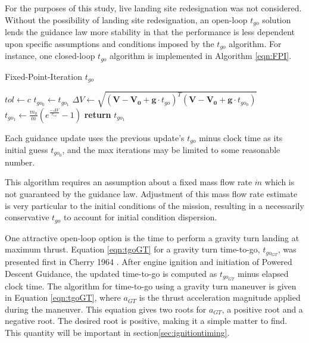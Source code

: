 For the purposes of this study, live landing site redesignation was not considered. Without the possibility of landing site redesignation, an open-loop $t_{go}$ solution lends the guidance law more stability in that the performance is less dependent upon specific assumptions and conditions imposed by the $t_{go}$ algorithm. For instance, one closed-loop $t_{go}$ algorithm is implemented in Algorithm \ref{eqn:FPI}.

\begin{algorithm}
	\caption{Fixed-Point-Iteration $t_{go}$}\label{eqn:FPI}
	\begin{algorithmic}[1]
		\State $tol\gets c$
		\State $t_{go_0} \gets t_{go_1}$
		\State $\Delta V \gets \sqrt{(\bm{V}-\bm{V_0} + \bm{g}\cdot t_{go})^T(\bm{V}-\bm{V_0} + \bm{g}\cdot t_{go_0})}$
		\State $t_{go_1} \gets \frac{m_0}{\dot{m}}\left(e^{\frac{-\Delta V}{v_{ex}}}-1\right)$ 
		\EndWhile
		\State \textbf{return} $t_{go_1}$
	\end{algorithmic}
\end{algorithm}

Each guidance update uses the previous update's $t_{go}$ minus clock time as its initial guess $t_{go_0}$, and the max iterations may be limited to some reasonable number.

This algorithm requires an assumption about a fixed mass flow rate $\dot{m}$ which is not guaranteed by the guidance law. Adjustment of this mass flow rate estimate is very particular to the initial conditions of the mission, resulting in a necessarily conservative $t_{go}$ to account for initial condition dispersion.

One attractive open-loop option is the time to perform a gravity turn landing at maximum thrust. Equation \ref{eqn:tgoGT} for a gravity turn time-to-go, $t_{go_{GT}}$, was presented first in Cherry 1964 \cite{CHERRY}. After engine ignition and initiation of Powered Descent Guidance, the updated time-to-go is computed as $t_{go_{GT}}$ minus elapsed clock time. The algorithm for time-to-go using a gravity turn maneuver is given in Equation \ref{eqn:tgoGT}, where $a_{GT}$ is the thrust acceleration magnitude applied during the maneuver. This equation gives two roots for $a_{GT}$, a positive root and a negative root. The desired root is positive, making it a simple matter to find. This quantity will be important in section\:\ref{sec:ignitiontiming}.

